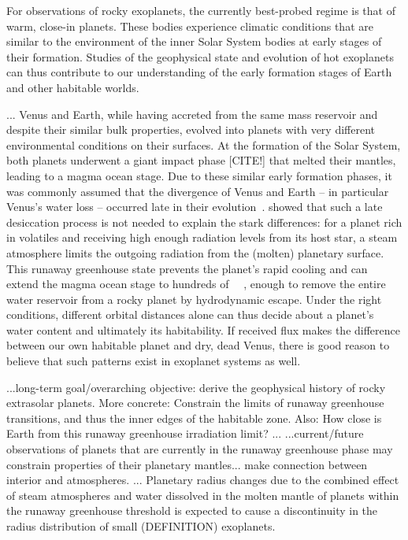 \documentclass[modern]{aastex631}
\begin{document}
\begin{note}
For observations of rocky exoplanets, the currently best-probed regime is that of warm, close-in planets.
These bodies experience climatic conditions that are similar to the environment of the inner Solar System bodies at early stages of their formation.
Studies of the geophysical state and evolution of hot exoplanets can thus contribute to our understanding of the early formation stages of Earth and other habitable worlds.

...
    Venus and Earth, while having accreted from the same mass reservoir and despite their similar bulk properties, evolved into planets with very different environmental conditions on their surfaces.
    At the formation of the Solar System, both planets underwent a giant impact phase [CITE!] that melted their mantles, leading to a magma ocean stage.
    Due to these similar early formation phases, it was commonly assumed that the divergence of Venus and Earth -- in particular Venus's water loss -- occurred late in their evolution~\citep{Elkins-Tanton2013}.
    \citet{Hamano2013} showed that such a late desiccation process is not needed to explain the stark differences: for a planet rich in volatiles and receiving high enough radiation levels from its host star, a steam atmosphere limits the outgoing radiation from the (molten) planetary surface.
    This runaway greenhouse state prevents the planet's rapid cooling and can extend the magma ocean stage to hundreds of \SI{}{\mega\year}, enough to remove the entire water reservoir from a rocky planet by hydrodynamic escape.
    Under the right conditions, different orbital distances alone can thus decide about a planet's water content and ultimately its habitability.
    If received flux makes the difference between our own habitable planet and dry, dead Venus, there is good reason to believe that such patterns exist in exoplanet systems as well.

    ...long-term goal/overarching objective: derive the geophysical history of rocky extrasolar planets. More concrete: Constrain the limits of runaway greenhouse transitions, and thus the inner edges of the habitable zone. Also: How close is Earth from this runaway greenhouse irradiation limit?
   ...
    ...current/future observations of planets that are currently in the runaway greenhouse phase may constrain properties of their planetary mantles... make connection between interior and atmospheres.
    ...
    Planetary radius changes due to the combined effect of steam atmospheres and water dissolved in the molten mantle of planets within the runaway greenhouse threshold is expected to cause a discontinuity in the radius distribution of small (DEFINITION) exoplanets.
\end{note}
\end{document}
